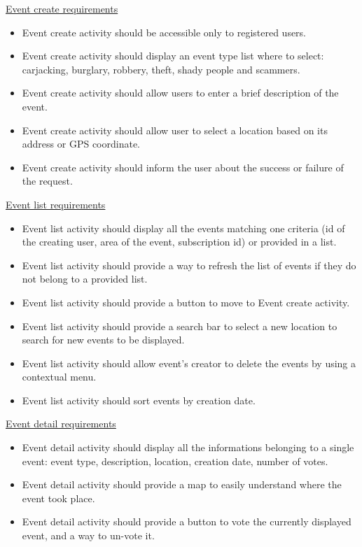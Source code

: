\documentclass[a4paper]{scrreprt}
\begin{document}
\underline{Event create requirements}
\begin{itemize}
\item Event create activity should be accessible only to registered users.
\item Event create activity should display an event type list where to select: carjacking, burglary, robbery, theft, shady people and scammers.
\item Event create activity should allow users to enter a brief description of the event.
\item Event create activity should allow user to select a location based on its address or GPS coordinate.
\item Event create activity should inform the user about the success or failure of the request.
\end{itemize}

\underline{Event list requirements}
\begin{itemize}
\item Event list activity should display all the events matching one criteria (id of the creating user, area of the event, subscription id) or provided in a list.
\item Event list activity should provide a way to refresh the list of events if they do not belong to a provided list.
\item Event list activity should provide a button to move to Event create activity.
\item Event list activity should provide a search bar to select a new location to search for new events to be displayed.
\item Event list activity should allow event's creator to delete the events by using a contextual menu.
\item Event list activity should sort events by creation date.
\end{itemize}

\underline{Event detail requirements}
\begin{itemize}
\item Event detail activity should display all the informations belonging to a single event: event type, description, location, creation date, number of votes.
\item Event detail activity should provide a map to easily understand where the event took place.
\item Event detail activity should provide a button to vote the currently displayed event, and a way to un-vote it.
\end{itemize}
\end{document}
